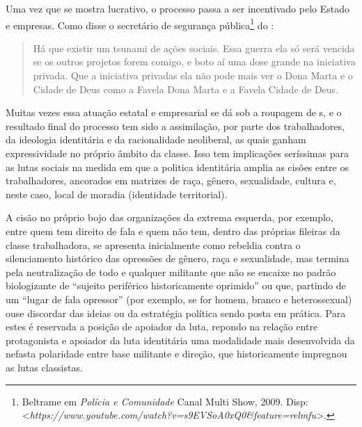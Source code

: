 Uma vez que se mostra lucrativo, o processo passa a ser incentivado pelo
Estado e empresas. Como disse o secretário de segurança
pública\footnote{Beltrame em \emph{Polícia e Comunidade} Canal Multi
  Show, 2009. Disp:
  \textless{}\emph{https://www.youtube.com/watch?v=s9EVSoA0xQ0\&feature=relmfu}\textgreater{}.} do :

\begin{quote}
Há que existir um tsunami de ações sociais. Essa guerra ela só será
vencida se os outros projetos forem comigo, e boto aí uma dose grande na
iniciativa privada. Que a iniciativa privadas ela não pode mais ver o
Dona Marta e o Cidade de Deus como a Favela Dona Marta e a Favela Cidade
de Deus.
\end{quote}

Muitas vezes essa atuação estatal e empresarial se dá sob a roupagem de
s, e o resultado final do processo tem sido a assimilação, por parte
dos trabalhadores, da ideologia identitária e da racionalidade
neoliberal, as quais ganham expressividade no próprio âmbito da classe.
Isso tem implicações seríssimas para as lutas sociais na medida em que a
politica identitária amplia as cisões entre os trabalhadores, ancorados
em matrizes de raça, gênero, sexualidade, cultura e, neste caso, local
de moradia (identidade territorial).

A cisão no próprio bojo das organizações da extrema esquerda, por
exemplo, entre quem tem direito de fala e quem não tem, dentro das
próprias fileiras da classe trabalhadora, se apresenta inicialmente como
rebeldia contra o silenciamento histórico das opressões de gênero, raça
e sexualidade, mas termina pela neutralização de todo e qualquer
militante que não se encaixe no padrão biologizante de ``sujeito
periférico historicamente oprimido'' ou que, partindo de um ``lugar de
fala opressor'' (por exemplo, se for homem, branco e heterossexual) ouse
discordar das ideias ou da estratégia política sendo posta em prática.
Para estes é reservada a posição de apoiador da luta, repondo na relação
entre protagonista e apoiador da luta identitária uma modalidade mais
desenvolvida da nefasta polaridade entre base militante e direção, que
historicamente impregnou as lutas classistas.

